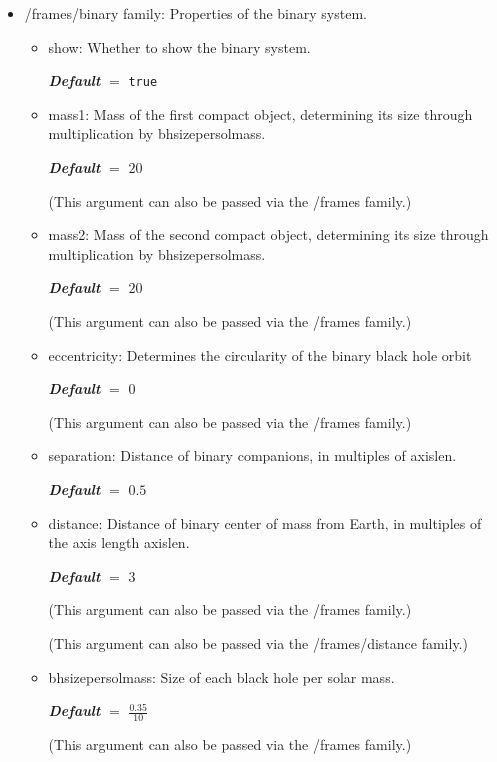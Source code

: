 \documentclass[
    DIV=11,
    BCOR=0mm,
    paper=a4,
    fontsize=11pt,
    twoside=false,
    titlepage=true
]{scrartcl}
\newcommand{\code}[1]{{\color{codecolor}\ttfamily#1}}  %
\newcommand{\defaultval}[1]{%
    {\bfseries\slshape%
    Default} $=$ \texttt{#1}%
}
\def\separatepassing#1{(This argument can also be passed via the \code{#1} family.)}
\begin{document}
\begin{itemize}
    \setlength{\itemsep}{10pt}

    \item \code{/frames/binary} family: Properties of the binary system.

    \begin{itemize}
        \item \code{show}: Whether to show the binary system.

        \defaultval{true}


        \item \code{mass1}: Mass of the first compact object, determining its size through multiplication by \code{bhsizepersolmass}.

        \defaultval{$20$}

        \separatepassing{/frames}


        \item \code{mass2}: Mass of the second compact object, determining its size through multiplication by \code{bhsizepersolmass}.

        \defaultval{$20$}

        \separatepassing{/frames}


        \item \code{eccentricity}: Determines the circularity of the binary black hole orbit

        \defaultval{$0$}

        \separatepassing{/frames}


        \item \code{separation}: Distance of binary companions, in multiples of \code{axislen}.

        \defaultval{$0.5$}


        \item \code{distance}: Distance of binary center of mass from Earth, in multiples of the axis length \code{axislen}.

        \defaultval{$3$}

        \separatepassing{/frames}

        \separatepassing{/frames/distance}


        \item \code{bhsizepersolmass}: Size of each black hole per solar mass.

        \defaultval{$\frac{0.35}{10}$}

        \separatepassing{/frames}
    \end{itemize}


\end{itemize}
\end{document}
